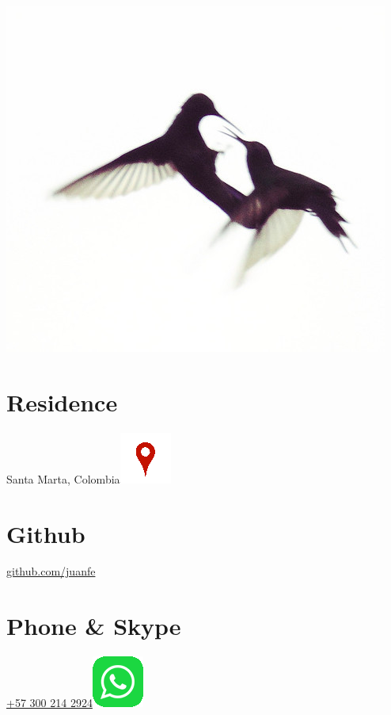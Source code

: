 \begin{aside}
  \includegraphics[scale=0.28]{img/coruscan.jpg}
    ~
  \section{Residence}
    Santa Marta, Colombia\includegraphics[scale=0.15]{img/ubicacion.png}
    ~
    ~
    ~
  \section{Github}
    \href{https://github.com/juanfe}{github.com/juanfe}
  \section{Phone \& Skype}
    \href{callto:+573002142924}{+57 300 214 2924\includegraphics[scale=0.15]{img/whatsapp.png}}
    ~
    ~
    ~
    ~

\end{aside}
